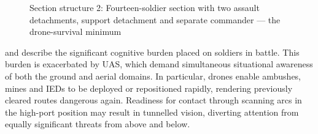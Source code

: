 \begin{figure}[H]
	\centering
	\caption[14 soldier section structure: drone survival minimum]{Section structure 2: Fourteen-soldier section with two assault detachments, support detachment and separate commander --- the drone-survival minimum}
	\label{sec2}
\end{figure}



\textcite[5:50--6:19]{kahn_2024_2_20} and \textcite{darragh_participant_4} describe the significant cognitive burden placed on soldiers in battle. This burden is exacerbated by UAS, which demand simultaneous situational awareness of both the ground and aerial domains. In particular, drones enable ambushes, mines and IEDs to be deployed or repositioned rapidly, rendering previously cleared routes dangerous again. Readiness for contact through scanning arcs in the high-port position may result in tunnelled vision, diverting attention from equally significant threats from above and below.

